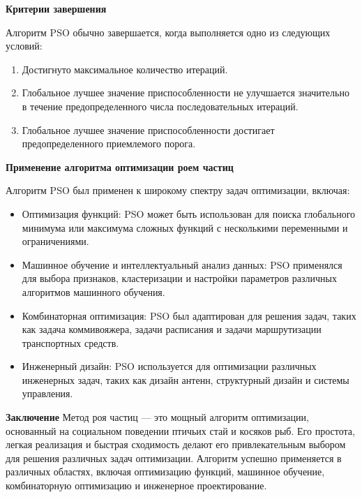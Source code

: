 \textbf{Критерии завершения}

Алгоритм PSO обычно завершается, когда выполняется одно из следующих условий:

\begin{enumerate}
    \item Достигнуто максимальное количество итераций.
    \item Глобальное лучшее значение приспособленности не улучшается
    значительно в течение предопределенного числа последовательных итераций.
    \item Глобальное лучшее значение приспособленности
    достигает предопределенного приемлемого порога.
\end{enumerate}

\textbf{Применение алгоритма оптимизации роем частиц}

Алгоритм PSO был применен к широкому спектру задач оптимизации, включая:

\begin{itemize}
    \item Оптимизация функций: PSO может быть использован для поиска
    глобального минимума или максимума сложных функций
    с несколькими переменными и ограничениями.
    \item Машинное обучение и интеллектуальный анализ данных:
    PSO применялся для выбора признаков, кластеризации и настройки
    параметров различных алгоритмов машинного обучения.
    \item Комбинаторная оптимизация: PSO был адаптирован для решения задач,
    таких как задача коммивояжера, задачи расписания
    и задачи маршрутизации транспортных средств.
    \item Инженерный дизайн: PSO используется для оптимизации различных
    инженерных задач, таких как дизайн антенн,
    структурный дизайн и системы управления.
\end{itemize}

\textbf{Заключение}
Метод роя частиц — это мощный алгоритм оптимизации,
основанный на социальном поведении птичьих стай и косяков рыб.
Его простота, легкая реализация и быстрая сходимость делают его
привлекательным выбором для решения различных задач оптимизации.
Алгоритм успешно применяется в различных областях, включая
оптимизацию функций, машинное обучение,
комбинаторную оптимизацию и инженерное проектирование.
